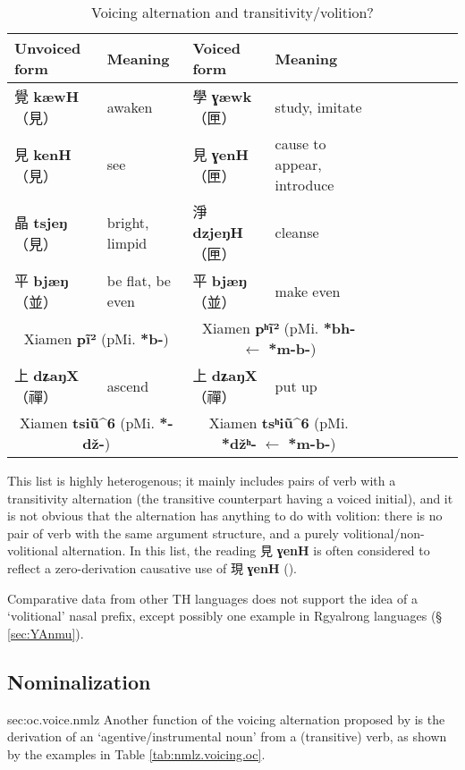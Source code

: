 \documentclass[oneside,a4paper,11pt]{article}
\newcommand{\ipa}[1]{\textbf{{\phon\mbox{#1}}}} %
\newcommand{\zh}[1]{{\cn #1}}
\newcommand{\zhc}[2]{\zh{#1} \ipa{#2}}
\newcommand{\mc}[1]{\zh{（#1）}}
\begin{document}
\begin{table}[H]
\caption{Voicing alternation and transitivity/volition?} \label{ex:voice.volition}
\begin{tabular}{llllllllll}
\toprule
Unvoiced form &Meaning & Voiced form & Meaning\\
\midrule
\zhc{覺}{kæwH} \mc{見}	&awaken & \zhc{學}{ɣæwk} \mc{匣} & study, imitate \\
\zhc{見}{kenH} \mc{見}	&see & \zhc{見}{ɣenH} \mc{匣} & cause to appear, introduce \\
\zhc{晶}{tsjeŋ} \mc{見}	&bright, limpid & \zhc{淨}{dzjeŋH} \mc{匣} & cleanse\\
\zhc{平}{bjæŋ} \mc{並}	&be flat, be even & \zhc{平}{bjæŋ} \mc{並}	 & make even \\
\multicolumn{2}{c}{Xiamen \ipa{pĩ²} (pMi. \ipa{*b-})} & \multicolumn{2}{c}{Xiamen  \ipa{pʰĩ²}  (pMi. \ipa{*bh-} $\leftarrow$ \ipa{*m-b-})} \\
\zhc{上}{dʑaŋX} \mc{禪}	&ascend & \zhc{上}{dʑaŋX} \mc{禪}	 & put up \\
\multicolumn{2}{c}{Xiamen \ipa{tsiũ^6}  (pMi. \ipa{*-dž-})} & \multicolumn{2}{c}{Xiamen  \ipa{tsʰiũ^6}  (pMi. \ipa{*džʰ-} $\leftarrow$ \ipa{*m-b-})} \\
\bottomrule
\end{tabular}
\end{table}

This list is highly heterogenous; it mainly includes  pairs of verb with a transitivity alternation (the transitive counterpart having a voiced initial), and it is not obvious that the alternation has anything to do with volition: there is no pair of verb with the same argument structure, and a purely volitional/non-volitional alternation. In this list, the reading \zhc{見}{ɣenH} is often considered to reflect a zero-derivation causative use of \zhc{現}{ɣenH} (\citealt[282-4]{wangyt14jingdian}).

Comparative data from other TH languages does not support the idea of a `volitional' nasal prefix, except possibly one example in Rgyalrong languages (§ \ref{sec:YAnmu}).

\subsection{Nominalization} {sec:oc.voice.nmlz}
Another function of the voicing alternation proposed by \citet[55]{bs14oc} is the derivation of an `agentive/instrumental noun' from a (transitive) verb, as shown by the examples in Table \ref{tab:nmlz.voicing.oc}.
\end{document}
